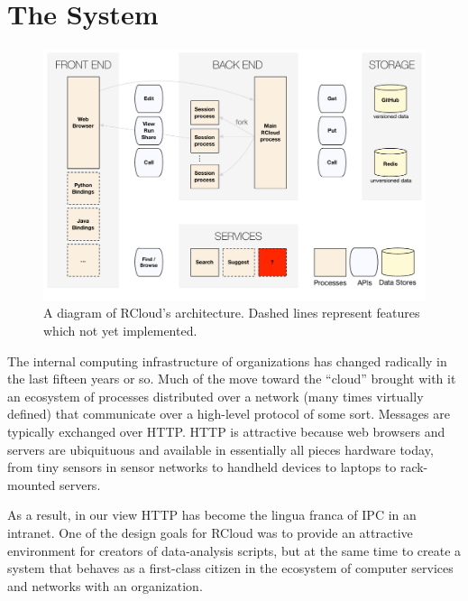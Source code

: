 \section{The System}


\begin{figure}
\includegraphics[width=\linewidth]{fig/system/system.pdf}
\caption{\label{fig:system}A diagram of RCloud's architecture. Dashed
  lines represent features which not yet implemented.}
\end{figure}

The internal computing infrastructure of organizations has changed
radically in the last fifteen years or so. Much of the move toward the
``cloud'' brought with it an ecosystem of processes distributed over a
network (many times virtually defined) that communicate over a
high-level protocol of some sort. Messages are typically exchanged
over HTTP. HTTP is attractive because web browsers and servers are
ubiquituous and available in essentially all pieces hardware today,
from tiny sensors in sensor networks to handheld devices to laptops to
rack-mounted servers.

As a result, in our view HTTP has become the lingua franca of IPC in
an intranet. One of the design goals for RCloud was to provide an
attractive environment for creators of data-analysis scripts, but at
the same time to create a system that behaves as a first-class citizen
in the ecosystem of computer services and networks with an
organization.


